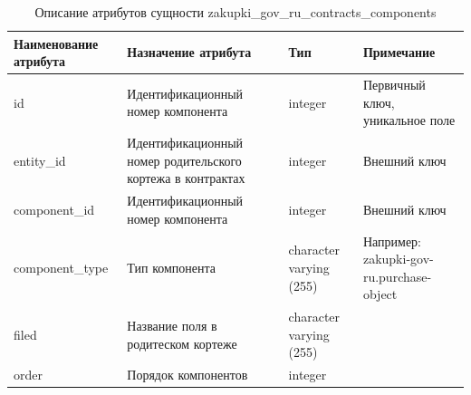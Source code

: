\documentclass{mirea}
\begin{document}
	\begin{longtable}{ |p{}|p{}|p{}|p{}| } 
		\caption{Описание атрибутов сущности zakupki\_gov\_ru\_contracts\_components}
		\endfirsthead
		\endhead
		\hline
		Наименование атрибута & Назначение атрибута & Тип & Примечание \\ \hline
		
		id & Идентификацион\-ный номер компонента & integer & Первичный ключ, уникальное поле \\ \hline
		
		entity\_id & Идентификацион\-ный номер родительского кортежа в контрактах & integer & Внешний ключ \\ \hline
		
		component\_id & Идентификацион\-ный номер компонента & integer & Внешний ключ \\ \hline
		
		component\_type & Тип компонента & character varying (255) & Например: zakupki-gov-ru.purchase-object \\ \hline
		
		filed & Название поля в родитеском кортеже & character varying (255) & \\ \hline
		
		order & Порядок компонентов & integer & \\ \hline	
		
	\end{longtable}
\end{document}
